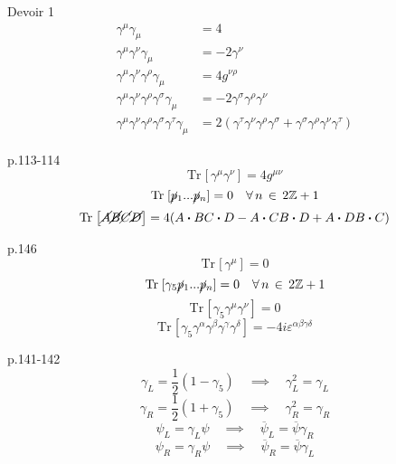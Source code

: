 \documentclass[12pt]{article}
\newcommand{\Z}{\mathbb{Z}}
\newcommand{\Tr}[1]{\mathrm{Tr}\hspace{1pt}\left[#1\right]}
\newcommand{\bdot}[0]{\boldsymbol{\cdot}}
\begin{document}
Devoir 1 \\
\begin{align}
  \gamma^\mu\gamma_\mu &= 4 \\
  \gamma^\mu\gamma^\nu\gamma_\mu &= -2\gamma^\nu \\
  \gamma^\mu\gamma^\nu\gamma^\rho\gamma_\mu &= 4g^{\nu\rho}\\
  \gamma^\mu\gamma^\nu\gamma^\rho\gamma^\sigma\gamma_\mu &= -2\gamma^\sigma\gamma^\rho\gamma^\nu\\
  \gamma^\mu\gamma^\nu\gamma^\rho\gamma^\sigma\gamma^\tau\gamma_\mu &= 2(\gamma^\tau\gamma^\nu\gamma^\rho\gamma^\sigma + \gamma^\sigma\gamma^\rho\gamma^\nu\gamma^\tau)
\end{align}

p.113-114 \\
\begin{equation}
  \Tr{\gamma^\mu\gamma^\nu} = 4g^{\mu\nu}
\end{equation}
\begin{equation}
  \Tr{\cancel{p}_1...\cancel{p}_n} = 0 \quad \forall\, n\, \in \, 2\Z+1
\end{equation}
\begin{equation}
  \Tr{\cancel{A}\cancel{B}\cancel{C}\cancel{D}} = 4(A\bdot B C \bdot D - A \bdot C B \bdot D + A \bdot D B \bdot C )
\end{equation}

p.146 \\
\begin{equation}
  \Tr{\gamma^\mu} = 0
\end{equation}
\begin{equation}
  \Tr{\gamma_5\cancel{p}_1...\cancel{p}_n} = 0 \quad \forall\, n\, \in \, 2\Z+1
\end{equation}
\begin{equation}
  \Tr{\gamma_5\gamma^\mu\gamma^\nu} = 0
\end{equation}
\begin{equation}
  \Tr{\gamma_5\gamma^\alpha\gamma^\beta\gamma^\gamma\gamma^\delta} = -4i\varepsilon^{\alpha\beta\gamma\delta}
\end{equation}

p.141-142
\begin{equation}
  \gamma_L = \frac{1}{2}(1-\gamma_5) \quad \implies \quad \gamma_L^2 = \gamma_L
\end{equation}
\begin{equation}
  \gamma_R = \frac{1}{2}(1+\gamma_5) \quad \implies \quad \gamma_R^2 = \gamma_R
\end{equation}
\begin{equation}
  \psi_L = \gamma_L\psi \quad \implies \quad \overline{\psi}_L = \overline{\psi}\gamma_R
\end{equation}
\begin{equation}
  \psi_R = \gamma_R\psi \quad \implies \quad \overline{\psi}_R = \overline{\psi}\gamma_L
\end{equation}
\end{document}
